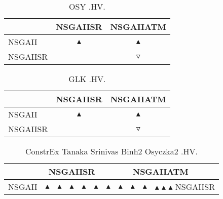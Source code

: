 \documentclass{article}
\begin{document}
\begin{table}
\caption{
OSY
.HV.}
\label{Table:
OSY
.HV.}
\centering
\begin{scriptsize}
\begin{tabular}{
lcc
}
\hline  & NSGAIISR & NSGAIIATM\\ 
\hline 
NSGAII
 & 
$\blacktriangle$
 & 
$\blacktriangle$
 \\ 
NSGAIISR
 & 
  
 & 
$\triangledown$
 \\ 
\hline
\end{tabular}
\end{scriptsize}
\end{table}
\begin{table}
\caption{
GLK
.HV.}
\label{Table:
GLK
.HV.}
\centering
\begin{scriptsize}
\begin{tabular}{
lcc
}
\hline  & NSGAIISR & NSGAIIATM\\ 
\hline 
NSGAII
 & 
$\blacktriangle$
 & 
$\blacktriangle$
 \\ 
NSGAIISR
 & 
  
 & 
$\triangledown$
 \\ 
\hline
\end{tabular}
\end{scriptsize}
\end{table}
\begin{table}
\caption{
ConstrEx Tanaka Srinivas Binh2 Osyczka2 
.HV.}
\label{Table:
ConstrEx Tanaka Srinivas Binh2 Osyczka2 
.HV.}
\centering
\begin{scriptsize}
\begin{tabular}{
| l | p{0.15cm}  p{0.15cm}  p{0.15cm}  p{0.15cm}  p{0.15cm}   | p{0.15cm}  p{0.15cm}  p{0.15cm}  p{0.15cm}  p{0.15cm}   | 
}
\hline \multicolumn{1}{|c|}{} & \multicolumn{5}{c|}{NSGAIISR} & \multicolumn{5}{c|}{NSGAIIATM} \\
\hline 
NSGAII
 & 
$\blacktriangle$
&
$\blacktriangle$
&
$\blacktriangle$
&
$\blacktriangle$
&
$\blacktriangle$
&
$\blacktriangle$
&
$\blacktriangle$
&
$\blacktriangle$
&
$\blacktriangle$
&
$\blacktriangle$
$\blacktriangle$
$\blacktriangle$
NSGAIISR
  
  
  \hline
\end{tabular}
\end{scriptsize}
\end{table}
\end{document}

